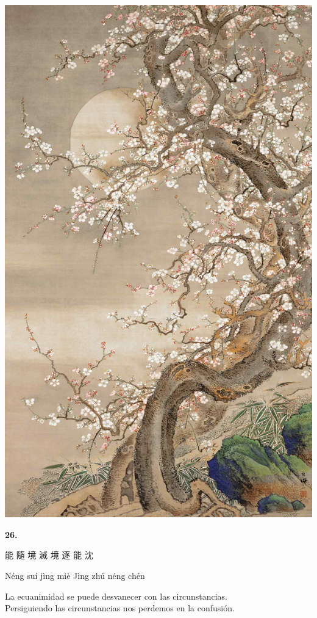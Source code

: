 \documentclass[
  a5paperpaper,
]{article}
\begin{document}
\hfill\break

\hypertarget{01}{}
\includegraphics{../img/image06.jpg}

\begin{verseblock}

\newpage

\begin{center}\textbf{26.}\end{center}

能 隨 境 滅 境 逐 能 沈

Néng suí jìng miè Jìng zhú néng chén

La ecuanimidad se puede desvanecer con las circunstancias.\\
Persiguiendo las circunstancias nos perdemos en la confusión.

\end{verseblock}
\end{document}
